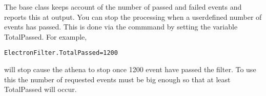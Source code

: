 \documentclass[11pt]{article}
\begin{document}
The base class keeps account of the number of passed and failed events and reports this at output. You can stop the processing when a userdefined number of events has passed. This is done via the commmand by setting the variable
TotalPassed. For example,

\begin{verbatim}
ElectronFilter.TotalPassed=1200
\end{verbatim}

will stop cause the athena to stop once 1200 event have passed the filter. To use this the number of requested events must be big enough so that at least TotalPassed will occur.
\end{document}
